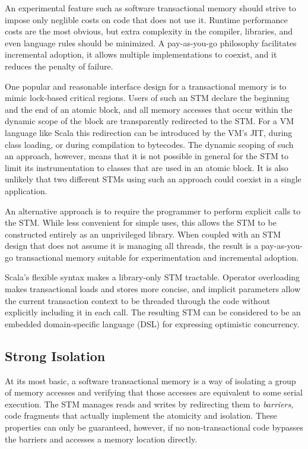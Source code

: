
An experimental feature such as software transactional memory should
strive to impose only neglible costs on code that does not use it.
Runtime performance costs are the most obvious, but extra complexity in
the compiler, libraries, and even language rules should be minimized.
A pay-as-you-go philosophy facilitates incremental adoption, it allows
multiple implementations to coexist, and it reduces the penalty of
failure.

One popular and reasonable interface design for a transactional memory
is to mimic lock-based critical regions.  Users of such an STM declare
the beginning and the end of an atomic block, and all memory accesses
that occur within the dynamic scope of the block are transparently
redirected to the STM.  For a VM language like Scala this redirection
can be introduced by the VM's JIT, during class loading, or during
compilation to bytecodes.  The dynamic scoping of such an approach,
however, means that it is not possible in general for the STM to limit its
instrumentation to classes that are used in an atomic block.  It is also
unlikely that two different STMs using such an approach could coexist
in a single application.

An alternative approach is to require the programmer to perform
explicit calls to the STM.  While less convenient for simple uses, this
allows the STM to be constructed entirely as an unprivileged library.
When coupled with an STM design that does not assume it is managing all
threads, the result is a pay-as-you-go transactional memory suitable
for experimentation and incremental adoption.

Scala's flexible syntax makes a library-only STM tractable.  Operator
overloading makes transactional loads and stores more concise,
and implicit parameters allow the current transaction context to be
threaded through the code without explicitly including it in each call.
The resulting STM can be considered to be an embedded domain-specific
language (DSL) for expressing optimistic concurrency.



\subsection*{Strong Isolation}

At its most basic, a software transactional memory is a way of isolating
a group of memory accesses and verifying that those accesses are
equivalent to some serial execution.  The STM manages reads and writes
by redirecting them to \textit{barriers}, code fragments that actually
implement the atomicity and isolation.  These properties can only be
guaranteed, however, if no non-transactional code bypasses the barriers
and accesses a memory location directly.

